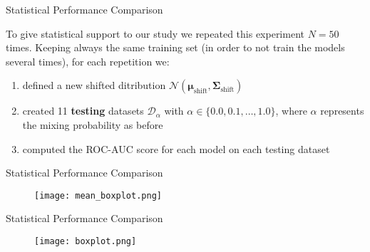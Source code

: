\begin{frame}{Statistical Performance Comparison}

    To give statistical support to our study we repeated this experiment $N = 50$ times. Keeping always the same training set (in order to not train the models several times), for each repetition we:
    \begin{enumerate}
        \item defined a new shifted ditribution $\mathcal{N}(\boldsymbol{\mu}_{\text{shift}}, \boldsymbol{\Sigma}_{\text{shift}}) $
        \item created 11 \textbf{testing} datasets $\mathcal{D}_\alpha$ with $\alpha \in \{0.0, 0.1, \ldots, 1.0\}$, where $\alpha$ represents the mixing probability as before
        \item computed the ROC-AUC score for each model on each testing dataset
    \end{enumerate}
\end{frame}

\begin{frame}{Statistical Performance Comparison}

  \begin{figure}
      \centering
      \vfill
      \texttt{[image: mean\_boxplot.png]}
  \end{figure}

\end{frame}

\begin{frame}{Statistical Performance Comparison}

    \begin{figure}
        \centering
        \vfill
        \texttt{[image: boxplot.png]}
    \end{figure}

\end{frame}
